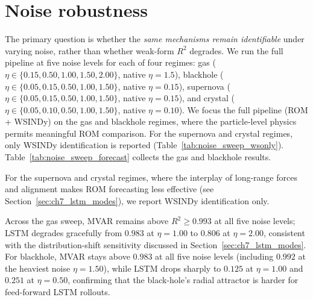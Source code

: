 \section{Noise robustness}
\label{app:noise_robustness}

The primary question is whether the \emph{same mechanisms remain
identifiable} under varying noise, rather than whether weak-form $R^2$
degrades.  We run the full pipeline at five noise levels for each of four
regimes: gas ($\eta\in\{0.15, 0.50, 1.00, 1.50, 2.00\}$, native
$\eta{=}1.5$), blackhole ($\eta\in\{0.05, 0.15, 0.50, 1.00, 1.50\}$,
native $\eta{=}0.15$), supernova ($\eta\in\{0.05, 0.15, 0.50, 1.00,
1.50\}$, native $\eta{=}0.15$), and crystal
($\eta\in\{0.05, 0.10, 0.50, 1.00, 1.50\}$, native $\eta{=}0.10$).
We focus the full pipeline (ROM + WSINDy) on the gas and blackhole
regimes, where the particle-level physics permits meaningful ROM
comparison.  For the supernova and crystal regimes, only WSINDy
identification is reported (Table~\ref{tab:noise_sweep_wsonly}).
Table~\ref{tab:noise_sweep_forecast} collects the gas and blackhole
results.

\begin{table}[ht]
\centering
\caption{Noise-sweep forecast $R^2$ for gas and blackhole regimes
(best of four IC families).
WSINDy $R^2_{\mathrm{wf},\rho}$ reports the weak-form fit on the density
field.  Native noise levels are marked with~$\star$.}
\label{tab:noise_sweep_forecast}
\renewcommand{\arraystretch}{0.92}
\small

\end{table}

For the supernova and crystal regimes, where the interplay of long-range
forces and alignment makes ROM forecasting less effective (see
Section~\ref{sec:ch7_lstm_modes}), we report WSINDy identification only.

\begin{table}[ht]
\centering
\caption{Noise-sweep WSINDy-only $R^2_{\mathrm{wf},\rho}$ for supernova and
crystal regimes.  Native noise levels are marked with~$\star$.}
\label{tab:noise_sweep_wsonly}
\renewcommand{\arraystretch}{0.92}
\small

\end{table}

Across the gas sweep, MVAR remains above $R^2 \geq 0.993$ at all five
noise levels; LSTM degrades gracefully from $0.983$ at $\eta{=}1.00$ to
$0.806$ at $\eta{=}2.00$, consistent with the distribution-shift
sensitivity discussed in Section~\ref{sec:ch7_lstm_modes}.
For blackhole, MVAR stays above $0.983$ at all five noise levels
(including $0.992$ at the heaviest noise $\eta{=}1.50$),
while LSTM drops sharply to $0.125$ at $\eta{=}1.00$ and $0.251$ at
$\eta{=}0.50$, confirming that the black-hole's radial
attractor is harder for feed-forward LSTM rollouts.

